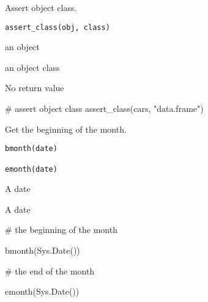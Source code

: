 \documentclass[letterpaper]{book}
\begin{document}
%
\begin{Description}
Assert object class.
\end{Description}
%
\begin{Usage}
\begin{verbatim}
assert_class(obj, class)
\end{verbatim}
\end{Usage}
%
\begin{Arguments}
\begin{ldescription}
\item[\code{obj}] an object

\item[\code{class}] an object class
\end{ldescription}
\end{Arguments}
%
\begin{Value}
No return value
\end{Value}
%
\begin{Examples}
\begin{ExampleCode}
# assert object class
assert_class(cars, "data.frame")

\end{ExampleCode}
\end{Examples}
%
\begin{Description}
Get the beginning of the month.
\end{Description}
%
\begin{Usage}
\begin{verbatim}
bmonth(date)

emonth(date)
\end{verbatim}
\end{Usage}
%
\begin{Arguments}
\begin{ldescription}
\item[\code{date}] A date
\end{ldescription}
\end{Arguments}
%
\begin{Value}
A date
\end{Value}
%
\begin{Examples}
\begin{ExampleCode}
# the beginning of the month

bmonth(Sys.Date())

# the end of the month

emonth(Sys.Date())

\end{ExampleCode}
\end{Examples}
\end{document}
